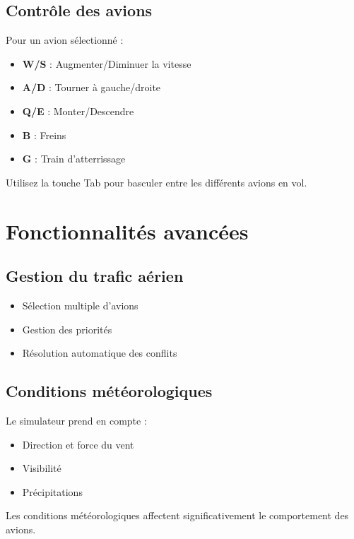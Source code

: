 \documentclass[12pt,a4paper]{article}
\begin{document}
\subsection{Contrôle des avions}
Pour un avion sélectionné :
\begin{itemize}
    \item \textbf{W/S} : Augmenter/Diminuer la vitesse
    \item \textbf{A/D} : Tourner à gauche/droite
    \item \textbf{Q/E} : Monter/Descendre
    \item \textbf{B} : Freins
    \item \textbf{G} : Train d'atterrissage
\end{itemize}

\begin{tcolorbox}[tip]
Utilisez la touche Tab pour basculer entre les différents avions en vol.
\end{tcolorbox}

\section{Fonctionnalités avancées}

\subsection{Gestion du trafic aérien}
\begin{itemize}
    \item Sélection multiple d'avions
    \item Gestion des priorités
    \item Résolution automatique des conflits
\end{itemize}

\subsection{Conditions météorologiques}
Le simulateur prend en compte :
\begin{itemize}
    \item Direction et force du vent
    \item Visibilité
    \item Précipitations
\end{itemize}

\begin{tcolorbox}[warning]
Les conditions météorologiques affectent significativement le comportement des avions.
\end{tcolorbox}
\end{document}
